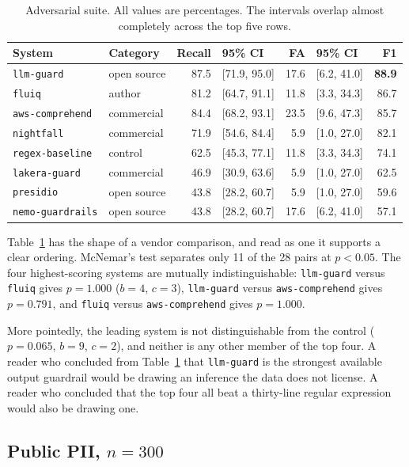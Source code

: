 \documentclass[11pt]{article}
\begin{document}
\begin{table}[t]
\centering
\small
\begin{tabular}{llrlrlr}
\toprule
System & Category & Recall & 95\% CI & FA & 95\% CI & F1 \\
\midrule
\texttt{llm-guard} & open source & 87.5 & [71.9, 95.0] & 17.6 & [6.2, 41.0] & \textbf{88.9} \\
\texttt{fluiq} & author & 81.2 & [64.7, 91.1] & 11.8 & [3.3, 34.3] & 86.7 \\
\texttt{aws-comprehend} & commercial & 84.4 & [68.2, 93.1] & 23.5 & [9.6, 47.3] & 85.7 \\
\texttt{nightfall} & commercial & 71.9 & [54.6, 84.4] & 5.9 & [1.0, 27.0] & 82.1 \\
\texttt{regex-baseline} & control & 62.5 & [45.3, 77.1] & 11.8 & [3.3, 34.3] & 74.1 \\
\texttt{lakera-guard} & commercial & 46.9 & [30.9, 63.6] & 5.9 & [1.0, 27.0] & 62.5 \\
\texttt{presidio} & open source & 43.8 & [28.2, 60.7] & 5.9 & [1.0, 27.0] & 59.6 \\
\texttt{nemo-guardrails} & open source & 43.8 & [28.2, 60.7] & 17.6 & [6.2, 41.0] & 57.1 \\
\bottomrule
\end{tabular}
\caption{Adversarial suite. All values are percentages. The intervals overlap
almost completely across the top five rows.}
\label{tab:adversarial}
\end{table}

Table~\ref{tab:adversarial} has the shape of a vendor comparison, and read as
one it supports a clear ordering. McNemar's test separates only 11 of the 28
pairs at $p < 0.05$. The four highest-scoring systems are mutually
indistinguishable: \texttt{llm-guard} versus \texttt{fluiq} gives $p = 1.000$
($b = 4$, $c = 3$), \texttt{llm-guard} versus \texttt{aws-comprehend} gives
$p = 0.791$, and \texttt{fluiq} versus \texttt{aws-comprehend} gives $p = 1.000$.

More pointedly, the leading system is not distinguishable from the control
($p = 0.065$, $b = 9$, $c = 2$), and neither is any other member of the top four.
A reader who concluded from Table~\ref{tab:adversarial} that \texttt{llm-guard}
is the strongest available output guardrail would be drawing an inference the
data does not license. A reader who concluded that the top four all beat a
thirty-line regular expression would also be drawing one.

\subsection{Public PII, \texorpdfstring{$n = 300$}{n = 300}}
\end{document}
